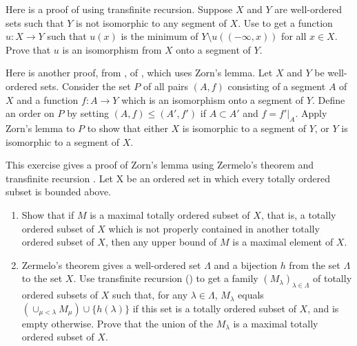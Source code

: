 \documentclass{article}
\begin{document}
\begin{exercise}
  \label{exe:eghnwow2}
  Here is a proof of  using transfinite recursion.
  Suppose \(X\) and \(Y\) are well-ordered sets such that \(Y\) is not
  isomorphic to any segment of \(X\).  Use  to
  get a function \(u : X \to Y\) such that \(u(x)\) is the minimum of
  \(Y \setminus u((-\infty, x))\) for all \(x \in X\).  Prove that
  \(u\) is an isomorphism from \(X\) onto a segment of \(Y\).
\end{exercise}

\begin{exercise}
  \label{exe:vgms7ihx}
  Here is another proof, from \textcite[\S2.5,
  Theorem~3]{bib:lmhdqwpw}, of , which uses Zorn's
  lemma.  Let \(X\) and \(Y\) be well-ordered sets.  Consider the set
  \(P\) of all pairs \((A,f)\) consisting of a segment \(A\) of \(X\)
  and a function \(f : A \to Y\) which is an isomorphism onto a
  segment of \(Y\).  Define an order on \(P\) by setting
  \((A,f) \leq (A',f')\) if \(A \subset A'\) and \(f = f' \vert_A\).
  Apply Zorn's lemma to \(P\) to show that either \(X\) is isomorphic
  to a segment of \(Y\), or \(Y\) is isomorphic to a segment of \(X\).
\end{exercise}

\begin{exercise}
  \label{exe:9d868h6m}
  This exercise gives a proof of Zorn's lemma using Zermelo's theorem
  and transfinite recursion \parencite[Chapter~II,
  Theorem~9.4]{bib:h8xsxpp7}.  Let X be an ordered set in which every
  totally ordered subset is bounded above.
  \begin{enumerate}
  \item Show that if \(M\) is a maximal totally ordered subset of
    \(X\), that is, a totally ordered subset of \(X\) which is not
    properly contained in another totally ordered subset of \(X\),
    then any upper bound of \(M\) is a maximal element of \(X\).
  \item Zermelo's theorem gives a well-ordered set \(\Lambda\) and a
    bijection \(h\) from the set \(\Lambda\) to the set \(X\).  Use
    transfinite recursion () to get a family
    \((M_\lambda)_{\lambda \in \Lambda}\) of totally ordered subsets
    of \(X\) such that, for any \(\lambda \in \Lambda\), \(M_\lambda\)
    equals \((\cup_{\mu < \lambda} M_\mu) \cup \{ h(\lambda) \}\) if
    this set is a totally ordered subset of \(X\), and is empty
    otherwise.  Prove that the union of the \(M_\lambda\) is a maximal
    totally ordered subset of \(X\).
  \end{enumerate}
\end{exercise}
\end{document}

